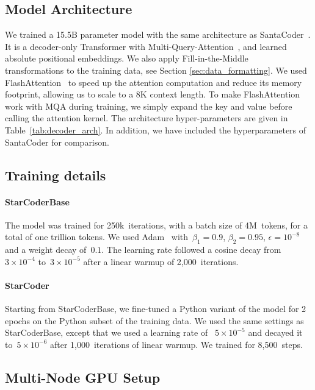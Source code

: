 \subsection{Model Architecture}\label{sec:model_architecture}
We trained a 15.5B parameter model with the same architecture as SantaCoder~\citep{allal2023santacoder}. It is a decoder-only Transformer with Multi-Query-Attention~\citep[MQA;][]{shazeer2019mqa}, and learned absolute positional embeddings. We also apply Fill-in-the-Middle~\citep[FIM;][]{bavarian2022fim} transformations to the training data, see Section \ref{sec:data_formatting}. We used FlashAttention~\citep{dao2022flashattention} to speed up the attention computation and reduce its memory footprint, allowing us to scale to a 8K context length. To make FlashAttention work with MQA during training, we simply expand the key and value before calling the attention kernel. The architecture hyper-parameters are given in Table~\ref{tab:decoder_arch}.  In addition, we have included the hyperparameters of SantaCoder\citep{allal2023santacoder} for comparison.  

\subsection{Training details}\label{sec:training_details}
\paragraph{StarCoderBase} The model was trained for 250k~iterations, with a batch size of 4M~tokens, for a total of one trillion tokens.  We used Adam~\citep{DBLP:journals/corr/KingmaB14} with~$\beta_1=0.9$, $\beta_2=0.95$, $\epsilon=10^{-8}$ and a weight decay of~$0.1$. The learning rate followed a cosine decay from~$3\times10^{-4}$ to~$3\times10^{-5}$ after a linear warmup of 2,000~iterations.

\paragraph{StarCoder} Starting from StarCoderBase, we fine-tuned a Python variant of the model for 2 epochs on the Python subset of the training data.  We used the same settings as StarCoderBase, except that we used a learning rate of ~$5\times10^{-5}$ and decayed it to~$5\times10^{-6}$ after 1,000~iterations of linear warmup. We trained for 8,500~steps. 

\subsection{Multi-Node GPU Setup}\label{sec:multinode_training}

